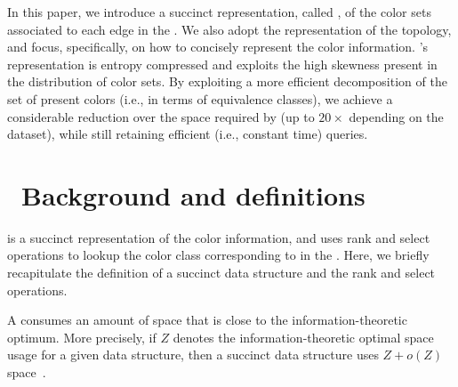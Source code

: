   In this paper, we introduce a succinct representation, called \system, of the
  color sets associated to each edge in the \dbg. We also adopt the \boss
  representation of the \dbg topology, and focus, specifically, on how to
  concisely represent the color information. \system's \cdbg representation is
  entropy compressed and exploits the high skewness present in the distribution
  of color sets. By exploiting a more efficient decomposition of the set of
  present colors (i.e., in terms of equivalence classes), we achieve a
  considerable reduction over the space required by \vari (up to $20\times$
  depending on the dataset), while still retaining efficient (i.e., constant
  time) queries.


\section{~Background and definitions}

\system is a succinct representation of the color information, and uses rank and
select operations to lookup the color class corresponding to \kmers in the \dbg.
Here, we briefly recapitulate the definition of a succinct data structure and the
rank and select operations.

A  consumes an amount of space that is close to
the information-theoretic optimum. More precisely, if $Z$ denotes the
information-theoretic optimal space usage for a given data structure, then a succinct
data structure uses $Z + o(Z)$ space~\cite{Jacobson89}.

